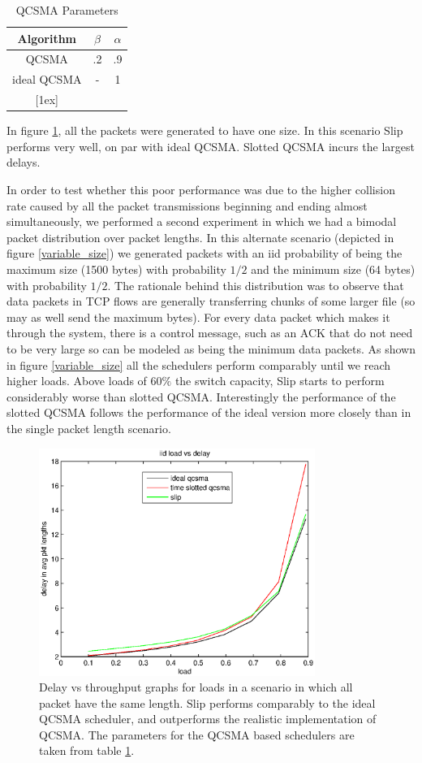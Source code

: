 \documentclass{IEEEtran}%
\begin{document}
\begin{table}[ht] \caption{QCSMA Parameters} 
\centering 
\begin{tabular}{c c c}
 \hline\hline 
 Algorithm & $\beta$ & $\alpha$ \\
  [0.5ex] \hline 
   QCSMA&.2&.9  \\
   ideal  QCSMA&-&1  \\
  [1ex] \hline 
  \end{tabular}
   \label{qcsma_parameters} 
\end{table}

In figure \ref{one_size}, all the packets were generated to have one size.  In this scenario Slip performs very well, on par with ideal QCSMA.  Slotted QCSMA incurs the largest delays.

In order to test whether this poor performance was due to the higher collision rate caused by all the packet transmissions beginning and ending almost simultaneously, we performed a second experiment in which we had a bimodal packet distribution over packet lengths.  In this alternate scenario (depicted in figure \ref{variable_size}) we generated packets with an iid probability of being the maximum size (1500 bytes) with probability $1/2$ and the minimum size (64 bytes) with probability $1/2$.  The rationale behind this distribution was to observe that data packets in TCP flows are generally transferring chunks of some larger file (so may as well send the maximum bytes).  For every data packet which makes it through the system, there is a control message, such as an ACK that do not need to be very large so can be modeled as being the minimum data packets.  As shown in figure \ref{variable_size} all the schedulers perform comparably until we reach higher loads.  Above loads of $60\%$ the switch capacity, Slip starts to perform considerably worse than slotted QCSMA.  Interestingly the performance of the slotted QCSMA follows the performance of the ideal version more closely than in the single packet length scenario.

\begin{figure}%
	 \includegraphics[width=90mm]{us_load.eps}
	\caption{Delay vs throughput graphs for loads in a scenario in which all packet have the same length.  Slip performs comparably to the ideal QCSMA scheduler, and outperforms the realistic implementation of QCSMA.  The parameters for the QCSMA based schedulers are taken from table \ref{qcsma_parameters}.} 	
	\label{one_size}
\end{figure}
\end{document}
